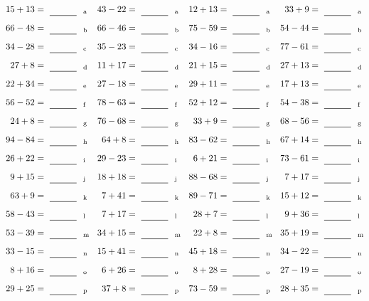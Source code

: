 \documentclass
[
  draft    = true,
  fontsize = 11pt,
  parskip  = half-
]
{scrartcl}
\begin{document}
\clearpage
\begin{align*}
    \pline{15+13}&=\rline{a}
  & \pline{43-22}&=\rline{a}
  & \pline{12+13}&=\rline{a}
  & \pline{33+9}&=\rline{a} \\[1ex]
    \pline{66-48}&=\rline{b}
  & \pline{66-46}&=\rline{b}
  & \pline{75-59}&=\rline{b}
  & \pline{54-44}&=\rline{b} \\[1ex]
    \pline{34-28}&=\rline{c}
  & \pline{35-23}&=\rline{c}
  & \pline{34-16}&=\rline{c}
  & \pline{77-61}&=\rline{c} \\[1ex]
    \pline{27+8}&=\rline{d}
  & \pline{11+17}&=\rline{d}
  & \pline{21+15}&=\rline{d}
  & \pline{27+13}&=\rline{d} \\[1ex]
    \pline{22+34}&=\rline{e}
  & \pline{27-18}&=\rline{e}
  & \pline{29+11}&=\rline{e}
  & \pline{17+13}&=\rline{e} \\[1ex]
    \pline{56-52}&=\rline{f}
  & \pline{78-63}&=\rline{f}
  & \pline{52+12}&=\rline{f}
  & \pline{54-38}&=\rline{f} \\[1ex]
    \pline{24+8}&=\rline{g}
  & \pline{76-68}&=\rline{g}
  & \pline{33+9}&=\rline{g}
  & \pline{68-56}&=\rline{g} \\[1ex]
    \pline{94-84}&=\rline{h}
  & \pline{64+8}&=\rline{h}
  & \pline{83-62}&=\rline{h}
  & \pline{67+14}&=\rline{h} \\[1ex]
    \pline{26+22}&=\rline{i}
  & \pline{29-23}&=\rline{i}
  & \pline{6+21}&=\rline{i}
  & \pline{73-61}&=\rline{i} \\[1ex]
    \pline{9+15}&=\rline{j}
  & \pline{18+18}&=\rline{j}
  & \pline{88-68}&=\rline{j}
  & \pline{7+17}&=\rline{j} \\[1ex]
    \pline{63+9}&=\rline{k}
  & \pline{7+41}&=\rline{k}
  & \pline{89-71}&=\rline{k}
  & \pline{15+12}&=\rline{k} \\[1ex]
    \pline{58-43}&=\rline{l}
  & \pline{7+17}&=\rline{l}
  & \pline{28+7}&=\rline{l}
  & \pline{9+36}&=\rline{l} \\[1ex]
    \pline{53-39}&=\rline{m}
  & \pline{34+15}&=\rline{m}
  & \pline{22+8}&=\rline{m}
  & \pline{35+19}&=\rline{m} \\[1ex]
    \pline{33-15}&=\rline{n}
  & \pline{15+41}&=\rline{n}
  & \pline{45+18}&=\rline{n}
  & \pline{34-22}&=\rline{n} \\[1ex]
    \pline{8+16}&=\rline{o}
  & \pline{6+26}&=\rline{o}
  & \pline{8+28}&=\rline{o}
  & \pline{27-19}&=\rline{o} \\[1ex]
    \pline{29+25}&=\rline{p}
  & \pline{37+8}&=\rline{p}
  & \pline{73-59}&=\rline{p}
  & \pline{28+35}&=\rline{p}
\end{align*}
\end{document}
